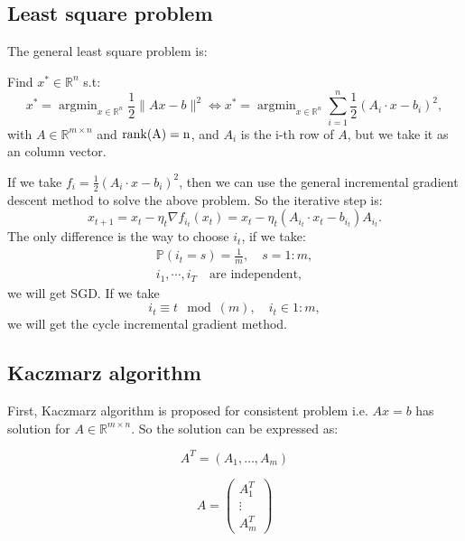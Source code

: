 \subsection{Least square problem}
The general least square problem is:
\begin{problem}\label{pro:standerLS}
	Find ${x}^{*} \in \mathbb{R}^{n}$  s.t:
	\begin{equation}\label{equ:leastsquare}
	{x}^* = \mathop{\arg\min}_{{x} \in \mathbb{R}^{n}} \frac{1}{2}\|A {x} - b\|^2 \Leftrightarrow {x}^* = \mathop{\arg\min}_{{x} \in \mathbb{R}^{n}} \sum_{i=1}^n \frac{1}{2}(A_i \cdot {x} - b_i)^2,
	\end{equation}
	with $A \in \mathbb{R}^{m\times n}$ and $\rm{rank}(A) = n$, and $A_i$
	is the i-th row of $A$, but we take it as an column vector.
\end{problem}
If we take $f_i = \frac{1}{2}(A_i \cdot {x} - b_i)^2$, then we can use the general incremental gradient descent method to solve the above problem. So the iterative step is:
\begin{equation}\label{equ:IGDforLS}
x_{t+1} = x_t - \eta_t \nabla f_{i_t}(x_t) = x_t - \eta_t (A_{i_t} \cdot x_t - b_{i_t})A_{i_t}.
\end{equation}
The only difference is the way to choose $i_t$, if we take:
\begin{align}
\mathbb{P}(i_t = s) = \frac{1}{m}, \quad s = 1:m,  \\
i_1, \cdots, i_T \quad \text{are independent},
\end{align}
we will get SGD. If we take 
\begin{equation}
i_t \equiv t \mod(m), \quad i_t \in 1:m,
\end{equation}
we will get the cycle incremental gradient method. 

\newpage

\subsection{Kaczmarz algorithm}
First, Kaczmarz algorithm is proposed for consistent problem i.e. $Ax
= b$ has solution for $A \in \mathbb{R}^{m\times n}$. So the solution
can be expressed as:

$$
A^T=  (A_1,\ldots, A_m)
$$

$$
A= 
\begin{pmatrix}
A_1^T\\
\vdots\\
A_m^T
\end{pmatrix}
$$

